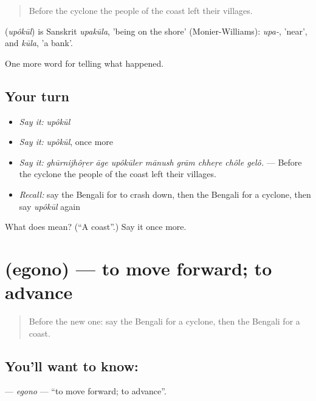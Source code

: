 \begin{quote}
Before the cyclone the people of the coast left their villages.
\end{quote}

\begin{cousinweb}
\textbf{} (\emph{upôkūl}) is Sanskrit \emph{upakūla}, 'being on the shore' (Monier-Williams): \emph{upa-}, 'near', and \emph{kūla}, 'a bank'.
\end{cousinweb}

\begin{grammarlens}[title={What you've built}]
One more word for telling what happened.
\end{grammarlens}

\subsection*{Your turn}
\begin{itemize}
\raggedright
  \item \emph{Say it:} \emph{upôkūl}
  \item \emph{Say it:} \emph{upôkūl}, once more
  \item \emph{Say it:} \emph{ghūrnijhôṛer āge upôkūler mānush grām chheṛe chôle gelô.} — Before the cyclone the people of the coast left their villages.
  \item \emph{Recall:} say the Bengali for to crash down, then the Bengali for a cyclone, then say \emph{upôkūl} again
\end{itemize}

\begin{tcolorbox}[breakable,colback=teal!4,colframe=teal!35!black,title={Before you move on}]
What does  mean? (\textquotedblleft{}A coast\textquotedblright{}.) Say it once more.
\end{tcolorbox}
\section[\texorpdfstring{\bn{এগোনো} (egono)}{এগোনো (egono)}]{ (egono) — to move forward; to advance}

\label{lesson:BN-C288-egono}



\begin{quote}
Before the new one: say the Bengali for a cyclone, then the Bengali for a coast.
\end{quote}

\subsection*{You'll want to know: }
\textbf{} — \emph{egono} — \textquotedblleft{}to move forward; to advance\textquotedblright{}.

